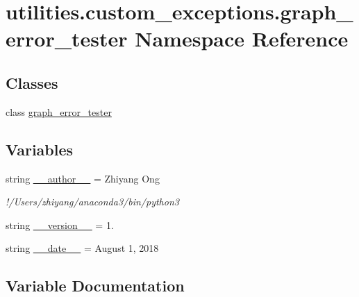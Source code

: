 \hypertarget{namespaceutilities_1_1custom__exceptions_1_1graph__error__tester}{}\section{utilities.\+custom\+\_\+exceptions.\+graph\+\_\+error\+\_\+tester Namespace Reference}
\label{namespaceutilities_1_1custom__exceptions_1_1graph__error__tester}
\subsection*{Classes}
\begin{DoxyCompactItemize}
\item 
class \hyperlink{classutilities_1_1custom__exceptions_1_1graph__error__tester_1_1graph__error__tester}{graph\+\_\+error\+\_\+tester}
\end{DoxyCompactItemize}
\subsection*{Variables}
\begin{DoxyCompactItemize}
\item 
string \hyperlink{namespaceutilities_1_1custom__exceptions_1_1graph__error__tester_a3dfce4d30766c0501517e21f0f7d81c8}{\+\_\+\+\_\+author\+\_\+\+\_\+} = \textquotesingle{}Zhiyang Ong\textquotesingle{}
\begin{DoxyCompactList}\small\item\em !/\+Users/zhiyang/anaconda3/bin/python3 \end{DoxyCompactList}\item 
string \hyperlink{namespaceutilities_1_1custom__exceptions_1_1graph__error__tester_a0737f017d717d1aa08ae05d54ae5a491}{\+\_\+\+\_\+version\+\_\+\+\_\+} = \textquotesingle{}1.\textquotesingle{}
\item 
string \hyperlink{namespaceutilities_1_1custom__exceptions_1_1graph__error__tester_aa140a2b3da93c2d18ff00df34291a231}{\+\_\+\+\_\+date\+\_\+\+\_\+} = \textquotesingle{}August 1, 2018\textquotesingle{}
\end{DoxyCompactItemize}


\subsection{Variable Documentation}
\hypertarget{namespaceutilities_1_1custom__exceptions_1_1graph__error__tester_a3dfce4d30766c0501517e21f0f7d81c8}{}
